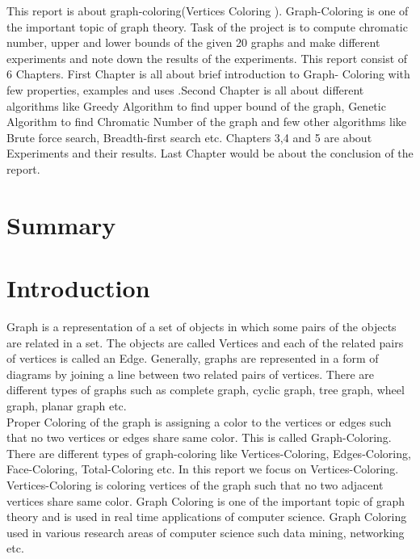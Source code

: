 \documentclass[a4paper]{report}
\begin{document}
	
	This report is about graph-coloring(Vertices Coloring ). Graph-Coloring is one of the important topic of graph theory. Task of the project is to compute chromatic number, upper and lower bounds of the given 20 graphs and make different experiments and note down the results of the experiments. This report consist of 6 Chapters. First Chapter is all about brief introduction to Graph- Coloring with few properties, examples and uses .Second Chapter is all about different algorithms like Greedy Algorithm to find upper bound of the graph, Genetic Algorithm to find Chromatic Number of the graph and few other algorithms like Brute force search, Breadth-first search etc. Chapters 3,4 and 5 are about Experiments and their results. Last Chapter would be about the conclusion of the report. 
	

	\chapter*{Summary}
	
	\tableofcontents
	
%	
	
	\chapter{Introduction}
	
	Graph is a representation of a set of objects in which some pairs of the objects are related in a set. The objects are called Vertices and each of the related pairs of vertices is called an Edge. Generally, graphs are represented in a form of diagrams by joining a line between two related pairs of vertices. There are different types of graphs such as complete graph, cyclic graph, tree graph, wheel graph, planar graph etc. 
\\
	Proper Coloring of the graph is assigning a color to the vertices or edges such that no two vertices or edges share same color. This is called Graph-Coloring. There are different types of graph-coloring like Vertices-Coloring, Edges-Coloring, Face-Coloring, Total-Coloring etc. In this report we focus on Vertices-Coloring. Vertices-Coloring is coloring vertices of the graph such that no two adjacent vertices share same color. Graph Coloring is one of the important topic of graph theory and is used in real time applications of computer science. Graph Coloring used in various research areas of computer science such data mining, networking etc.
\\
	
\end{document}
